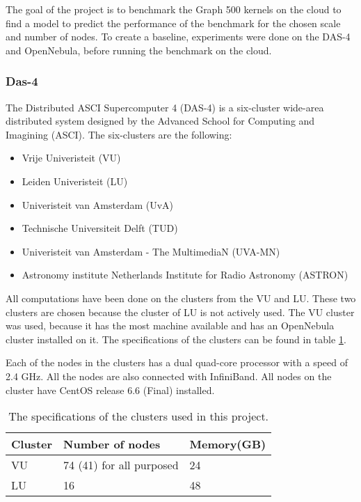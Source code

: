 The goal of the project is to benchmark the Graph 500 kernels on the cloud to find a model to predict the performance of the benchmark for the chosen scale and number of nodes. To create a baseline, experiments were done on the DAS-4 and OpenNebula, before running the benchmark on the cloud.
\subsubsection{Das-4}
\label{hw:das4}
The Distributed ASCI Supercomputer 4 (DAS-4) is a six-cluster wide-area distributed system designed by the Advanced School for Computing and Imagining (ASCI)\cite{das-4}. The six-clusters are the following:
\begin{itemize}
\item Vrije Univeristeit (VU)
\item Leiden Univeristeit (LU)
\item Univeristeit van Amsterdam (UvA) 
\item Technische Universiteit Delft (TUD)
\item Univeristeit van Amsterdam - The MultimediaN (UVA-MN) 
\item Astronomy institute Netherlands Institute for Radio Astronomy (ASTRON)
\end{itemize}
All computations have been done on the clusters from the VU and LU. These two clusters are chosen because the cluster of LU is not actively used. The VU cluster was used, because it has the most machine available and has an OpenNebula cluster installed on it. The specifications of the clusters can be found in table \ref{tab:das-clusters}. 

Each of the nodes in the clusters has a dual quad-core processor with a speed of 2.4 GHz. All the nodes are also connected with InfiniBand\cite{infiniband}. All nodes on the cluster have CentOS release 6.6 (Final) installed.
\begin{table}[!h]
	\begin{center}
\begin{tabular}{|l|l|l|}
\hline
Cluster & Number of nodes  & Memory(GB) \\ \hline
VU 		& 74 (41) for all purposed	 & 24			\\ \hline
LU		& 16 & 48 \\ \hline
\end{tabular}
\end{center}
\caption{The specifications of the clusters used in this project.}
\label{tab:das-clusters}
\end{table}



